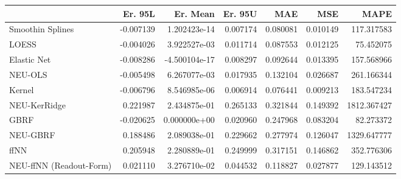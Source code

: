 \begin{tabular}{lrrrrrr}
\toprule
{} &   Er. 95L &      Er. Mean &   Er. 95U &       MAE &       MSE &         MAPE \\
\midrule
Smoothin Splines        & -0.007139 &  1.202423e-14 &  0.007174 &  0.080081 &  0.010149 &   117.317583 \\
LOESS                   & -0.004026 &  3.922527e-03 &  0.011714 &  0.087553 &  0.012125 &    75.452075 \\
Elastic Net             & -0.008286 & -4.500104e-17 &  0.008297 &  0.092644 &  0.013395 &   157.568966 \\
NEU-OLS                 & -0.005498 &  6.267077e-03 &  0.017935 &  0.132104 &  0.026687 &   261.166344 \\
Kernel                  & -0.006796 &  8.546985e-06 &  0.006914 &  0.076441 &  0.009213 &   183.547234 \\
NEU-KerRidge            &  0.221987 &  2.434875e-01 &  0.265133 &  0.321844 &  0.149392 &  1812.367427 \\
GBRF                    & -0.020625 &  0.000000e+00 &  0.020960 &  0.247968 &  0.083204 &    82.273372 \\
NEU-GBRF                &  0.188486 &  2.089038e-01 &  0.229662 &  0.277974 &  0.126047 &  1329.647777 \\
ffNN                    &  0.205948 &  2.280889e-01 &  0.249999 &  0.317151 &  0.146862 &   352.776306 \\
NEU-ffNN (Readout-Form) &  0.021110 &  3.276710e-02 &  0.044532 &  0.118827 &  0.027877 &   129.143512 \\
\bottomrule
\end{tabular}
